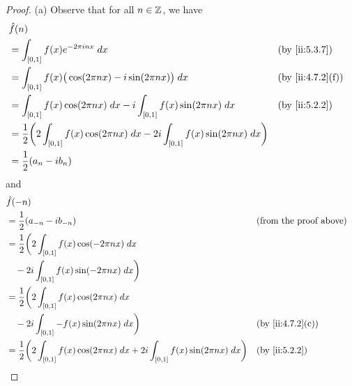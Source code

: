 \begin{proof}{(a)}
  Observe that for all \(n \in \mathbb{Z}\), we have
  \begin{align*}
     & \hat{f}(n)                                                                                                                                \\
     & = \int_{[0, 1]} f(x) e^{- 2 \pi i n x} \; dx                                                                        &  & \by{ii:5.3.7}    \\
     & = \int_{[0, 1]} f(x) \big(\cos(2 \pi n x) - i \sin(2 \pi n x)\big) \; dx                                            &  & \by{ii:4.7.2}[f] \\
     & = \int_{[0, 1]} f(x) \cos(2 \pi n x) \; dx - i \int_{[0, 1]} f(x) \sin(2 \pi n x) \; dx                             &  & \by{ii:5.2.2}    \\
     & = \dfrac{1}{2} \bigg(2 \int_{[0, 1]} f(x) \cos(2 \pi n x) \; dx - 2i \int_{[0, 1]} f(x) \sin(2 \pi n x) \; dx\bigg)                       \\
     & = \dfrac{1}{2} (a_n - i b_n)
  \end{align*}
  and
  \begin{align*}
     & \hat{f}(-n)                                                                                                                                            \\
     & = \dfrac{1}{2} (a_{-n} - i b_{-n})                                                                                  &  & \text{(from the proof above)} \\
     & = \dfrac{1}{2} \bigg(2 \int_{[0, 1]} f(x) \cos(- 2 \pi n x) \; dx                                                                                      \\
     & \quad - 2i \int_{[0, 1]} f(x) \sin(- 2 \pi n x) \; dx\bigg)                                                                                            \\
     & = \dfrac{1}{2} \bigg(2 \int_{[0, 1]} f(x) \cos(2 \pi n x) \; dx                                                                                        \\
     & \quad - 2i \int_{[0, 1]} -f(x) \sin(2 \pi n x) \; dx\bigg)                                                          &  & \by{ii:4.7.2}[c]              \\
     & = \dfrac{1}{2} \bigg(2 \int_{[0, 1]} f(x) \cos(2 \pi n x) \; dx + 2i \int_{[0, 1]} f(x) \sin(2 \pi n x) \; dx\bigg) &  & \by{ii:5.2.2}                 \\

\end{align*}
\end{proof}
